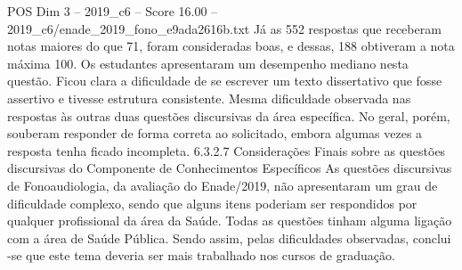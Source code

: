 \begin{textsample}{POS Dim 3 – 2019\_c6 – Score 16.00 – 2019\_c6/enade\_2019\_fono\_e9ada2616b.txt}
Já as 552 respostas que receberam notas maiores do que 71, foram consideradas boas, e dessas, 188 obtiveram a nota máxima 100.
Os estudantes apresentaram um desempenho mediano nesta questão.
Ficou clara a dificuldade de se escrever um texto dissertativo que fosse assertivo e tivesse estrutura consistente.
Mesma dificuldade observada nas respostas às outras duas questões discursivas da área específica.
No geral, porém, souberam responder de forma correta ao solicitado, embora algumas vezes a resposta tenha ficado incompleta. 6.3.2.7 Considerações Finais sobre as questões discursivas do Componente de Conhecimentos Específicos As questões discursivas de Fonoaudiologia, da avaliação do Enade/2019, não apresentaram um grau de dificuldade complexo, sendo que alguns itens poderiam ser respondidos por qualquer profissional da área da Saúde.
Todas as questões tinham alguma ligação com a área de Saúde Pública.
Sendo assim, pelas dificuldades observadas, conclui -se que este tema deveria ser mais trabalhado nos cursos de graduação.

\end{textsample}
